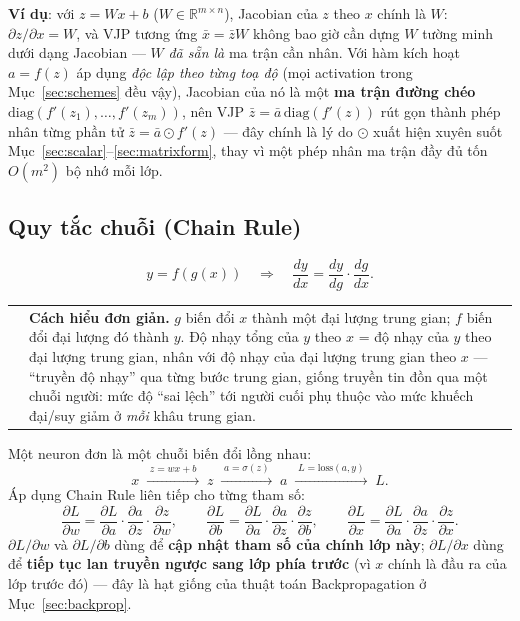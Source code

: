 \documentclass[12pt,a4paper]{article}
\makeatletter
\newenvironment{tructiep}[1][Cách hiểu đơn giản]
  {\par\smallskip\noindent\begin{tabular}{@{}p{0.35em}@{\hspace{6pt}}p{\dimexpr\linewidth-1.9em\relax}@{}}
   \textcolor{boxln}{\rule{2pt}{\baselineskip}} & \textbf{#1.}\enspace\ignorespaces}
  {\end{tabular}\par\smallskip}
\makeatother
\begin{document}
\textbf{Ví dụ}: với $z=Wx+b$ ($W\in\mathbb R^{m\times n}$), Jacobian của
$z$ theo $x$ chính là $W$: $\partial z/\partial x = W$, và VJP tương ứng
$\bar x=\bar zW$ không bao giờ cần dựng $W$ tường minh dưới dạng Jacobian
--- $W$ \emph{đã sẵn là} ma trận cần nhân. Với hàm kích hoạt $a=f(z)$ áp
dụng \emph{độc lập theo từng toạ độ} (mọi activation trong
Mục~\ref{sec:schemes} đều vậy), Jacobian của nó là một \textbf{ma trận
đường chéo} $\mathrm{diag}(f'(z_1),\ldots,f'(z_m))$, nên VJP
$\bar z=\bar a\,\mathrm{diag}(f'(z))$ rút gọn thành phép nhân từng phần tử
$\bar z=\bar a\odot f'(z)$ --- đây chính là lý do $\odot$ xuất hiện xuyên
suốt Mục~\ref{sec:scalar}--\ref{sec:matrixform}, thay vì một phép nhân ma
trận đầy đủ tốn $O(m^2)$ bộ nhớ mỗi lớp.

\subsection{Quy tắc chuỗi (Chain Rule)}
\label{sec:chainrule}

$$y = f(g(x)) \quad\Longrightarrow\quad \frac{dy}{dx} = \frac{dy}{dg}\cdot\frac{dg}{dx}.$$

\begin{tructiep}
$g$ biến đổi $x$ thành một đại lượng trung gian; $f$ biến đổi đại lượng đó
thành $y$. Độ nhạy tổng của $y$ theo $x$ = độ nhạy của $y$ theo đại lượng
trung gian, nhân với độ nhạy của đại lượng trung gian theo $x$ --- ``truyền
độ nhạy'' qua từng bước trung gian, giống truyền tin đồn qua một chuỗi
người: mức độ ``sai lệch'' tới người cuối phụ thuộc vào mức khuếch đại/suy
giảm ở \emph{mỗi} khâu trung gian.
\end{tructiep}

Một neuron đơn là một chuỗi biến đổi lồng nhau:
$$x \;\xrightarrow{\;z=wx+b\;}\; z \;\xrightarrow{\;a=\sigma(z)\;}\; a \;\xrightarrow{\;L=\mathrm{loss}(a,y)\;}\; L.$$
Áp dụng Chain Rule liên tiếp cho từng tham số:
$$\frac{\partial L}{\partial w} = \frac{\partial L}{\partial a}\cdot\frac{\partial a}{\partial z}\cdot\frac{\partial z}{\partial w}, \qquad
\frac{\partial L}{\partial b} = \frac{\partial L}{\partial a}\cdot\frac{\partial a}{\partial z}\cdot\frac{\partial z}{\partial b}, \qquad
\frac{\partial L}{\partial x} = \frac{\partial L}{\partial a}\cdot\frac{\partial a}{\partial z}\cdot\frac{\partial z}{\partial x}.$$
$\partial L/\partial w$ và $\partial L/\partial b$ dùng để \textbf{cập nhật
tham số của chính lớp này}; $\partial L/\partial x$ dùng để \textbf{tiếp
tục lan truyền ngược sang lớp phía trước} (vì $x$ chính là đầu ra của lớp
trước đó) --- đây là hạt giống của thuật toán Backpropagation ở
Mục~\ref{sec:backprop}.
\end{document}
